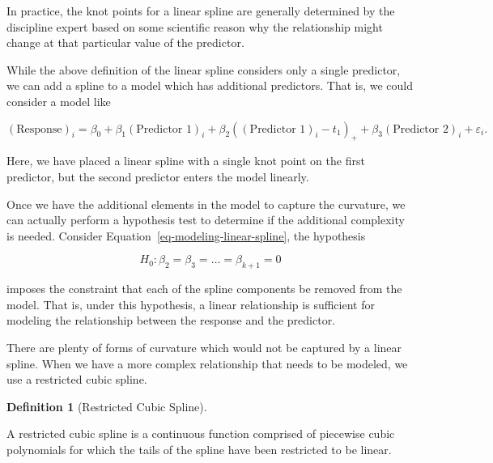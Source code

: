 \documentclass[
  letterpaper,
  DIV=11,
  numbers=noendperiod]{scrreprt}
\theoremstyle{definition}
\theoremstyle{definition}
\newtheorem{definition}{Definition}[chapter]
\theoremstyle{remark}
\begin{document}
\begin{tcolorbox}[enhanced jigsaw, bottomrule=.15mm, titlerule=0mm, bottomtitle=1mm, colback=white, coltitle=black, rightrule=.15mm, leftrule=.75mm, toprule=.15mm, toptitle=1mm, left=2mm, opacityback=0, colframe=quarto-callout-note-color-frame, breakable, title=\textcolor{quarto-callout-note-color}{\faInfo}\hspace{0.5em}{Note}, arc=.35mm, colbacktitle=quarto-callout-note-color!10!white, opacitybacktitle=0.6]

In practice, the knot points for a linear spline are generally
determined by the discipline expert based on some scientific reason why
the relationship might change at that particular value of the predictor.

\end{tcolorbox}

While the above definition of the linear spline considers only a single
predictor, we can add a spline to a model which has additional
predictors. That is, we could consider a model like

\[(\text{Response})_i = \beta_0 + \beta_1 (\text{Predictor 1})_i + \beta_2 \left((\text{Predictor 1})_i - t_1\right)_+ + \beta_3(\text{Predictor } 2)_i + \varepsilon_i.\]

Here, we have placed a linear spline with a single knot point on the
first predictor, but the second predictor enters the model linearly.

Once we have the additional elements in the model to capture the
curvature, we can actually perform a hypothesis test to determine if the
additional complexity is needed. Consider
Equation~\ref{eq-modeling-linear-spline}, the hypothesis

\[H_0: \beta_2 = \beta_3 = \dotsc = \beta_{k+1} = 0\]

imposes the constraint that each of the spline components be removed
from the model. That is, under this hypothesis, a linear relationship is
sufficient for modeling the relationship between the response and the
predictor.

There are plenty of forms of curvature which would not be captured by a
linear spline. When we have a more complex relationship that needs to be
modeled, we use a restricted cubic spline.

\begin{definition}[Restricted Cubic
Spline]\protect\hypertarget{def-restricted-cubic-spline}{}\label{def-restricted-cubic-spline}

A restricted cubic spline is a continuous function comprised of
piecewise cubic polynomials for which the tails of the spline have been
restricted to be linear.

\end{definition}
\end{document}
